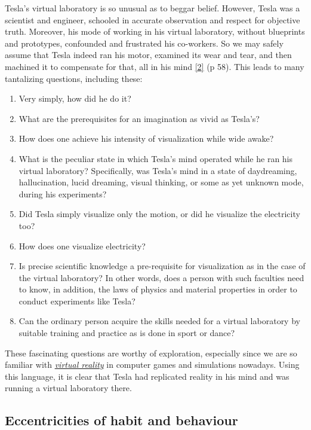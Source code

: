 \documentclass[
  a4paper,
]{article}
\providecommand{\tightlist}{%
  \setlength{\itemsep}{0pt}\setlength{\parskip}{0pt}}
\begin{document}
Tesla's virtual laboratory is so unusual as to beggar belief. However,
Tesla was a scientist and engineer, schooled in accurate observation and
respect for objective truth. Moreover, his mode of working in his
virtual laboratory, without blueprints and prototypes, confounded and
frustrated his co-workers. So we may safely assume that Tesla indeed ran
his motor, examined its wear and tear, and then machined it to
compensate for that, all in his mind
\protect\hyperlink{ref-oneill80}{{[}2{]}} (p 58). This leads to many
tantalizing questions, including these:

\begin{enumerate}
\tightlist
\item
  Very simply, how did he do it?
\item
  What are the prerequisites for an imagination as vivid as Tesla's?
\item
  How does one achieve his intensity of visualization while wide awake?
\item
  What is the peculiar state in which Tesla's mind operated while he ran
  his virtual laboratory? Specifically, was Tesla's mind in a state of
  daydreaming, hallucination, lucid dreaming, visual thinking, or some
  as yet unknown mode, during his experiments?
\item
  Did Tesla simply visualize only the motion, or did he visualize the
  electricity too?
\item
  How does one visualize electricity?
\item
  Is precise scientific knowledge a pre-requisite for visualization as
  in the case of the virtual laboratory? In other words, does a person
  with such faculties need to know, in addition, the laws of physics and
  material properties in order to conduct experiments like Tesla?
\item
  Can the ordinary person acquire the skills needed for a virtual
  laboratory by suitable training and practice as is done in sport or
  dance?
\end{enumerate}

These fascinating questions are worthy of exploration, especially since
we are so familiar with
\href{https://en.wikipedia.org/wiki/Virtual_reality}{\emph{virtual
reality}} in computer games and simulations nowadays. Using this
language, it is clear that Tesla had replicated reality in his mind and
was running a virtual laboratory there.

\hypertarget{eccentricities-of-habit-and-behaviour}{%
\subsection{Eccentricities of habit and
behaviour}\label{eccentricities-of-habit-and-behaviour}}
\end{document}
